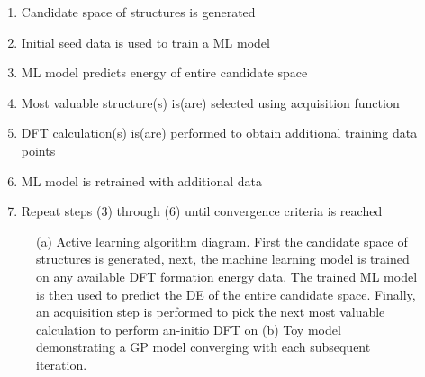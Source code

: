 \begin{enumerate}
  \item Candidate space of structures is generated
  \item Initial seed data is used to train a ML model
  \item ML model predicts energy of entire candidate space
  \item Most valuable structure(s) is(are) selected using acquisition function
  \item DFT calculation(s) is(are) performed to obtain additional training data points
  \item ML model is retrained with additional data
  \item Repeat steps (3) through (6) until convergence criteria is reached
\end{enumerate}


\begin{figure}
\centering
{}
\caption{\label{fig:all_diagram}
(a) Active learning algorithm diagram.
First the candidate space of structures is generated,
next, the machine learning model is trained on any available DFT formation energy data.
The trained ML model is then used to predict the DE of the entire candidate space.
Finally, an acquisition step is performed to pick the next most valuable calculation to perform an-initio DFT on
(b) Toy model demonstrating a GP model converging with each subsequent iteration.
}
\end{figure}






